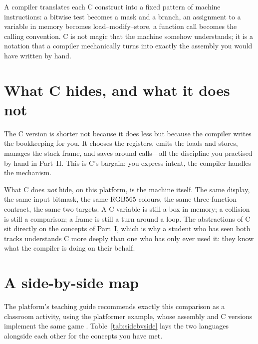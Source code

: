 \begin{prgconcept}
A compiler translates each C construct into a fixed pattern of machine
instructions: a bitwise test becomes a mask and a branch, an assignment to a
variable in memory becomes load--modify--store, a function call becomes the
calling convention. C is not magic that the machine somehow understands; it is a
notation that a compiler mechanically turns into exactly the assembly you would
have written by hand.
\end{prgconcept}

\section{What C hides, and what it does not}

The C version is shorter not because it does less but because the compiler writes
the bookkeeping for you. It chooses the registers, emits the loads and stores,
manages the stack frame, and saves  around calls---all the discipline you
practised by hand in Part~II. This is C's bargain: you express intent, the
compiler handles the mechanism.

What C does \emph{not} hide, on this platform, is the machine itself. The same
display, the same input bitmask, the same RGB565 colours, the same three-function
contract, the same two targets. A C variable is still a box in memory; a collision
is still a comparison; a frame is still a turn around a loop. The abstractions of C
sit directly on the concepts of Part~I, which is why a student who has seen both
tracks understands C more deeply than one who has only ever used it: they know what
the compiler is doing on their behalf.

\section{A side-by-side map}

The platform's teaching guide recommends exactly this comparison as a classroom
activity, using the platformer example, whose assembly and C versions implement
the same game \citep{prg32teaching}. Table~\ref{tab:sidebyside} lays the two
languages alongside each other for the concepts you have met.


